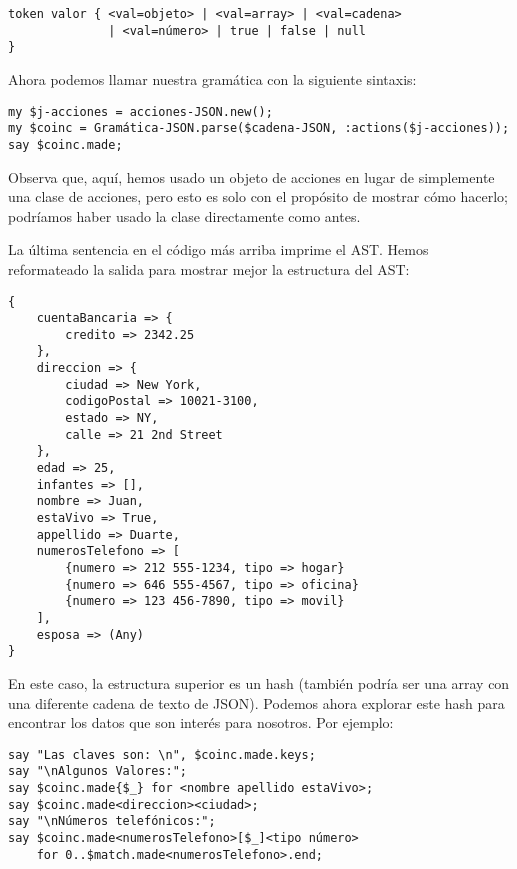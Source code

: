 \begin{verbatim}
token valor { <val=objeto> | <val=array> | <val=cadena> 
              | <val=número> | true | false | null
}
\end{verbatim}

Ahora podemos llamar nuestra gramática con la
siguiente sintaxis:

\begin{verbatim}
my $j-acciones = acciones-JSON.new();
my $coinc = Gramática-JSON.parse($cadena-JSON, :actions($j-acciones));
say $coinc.made;
\end{verbatim}

Observa que, aquí, hemos usado un objeto de acciones en lugar
de simplemente una clase de acciones, pero esto es solo con 
el propósito de mostrar cómo hacerlo; podríamos haber usado
la clase directamente como antes.

La última sentencia en el código más arriba imprime el AST.
Hemos reformateado la salida para mostrar mejor la estructura
del AST:


\begin{verbatim}
{
    cuentaBancaria => {
        credito => 2342.25
    }, 
    direccion => {
        ciudad => New York, 
        codigoPostal => 10021-3100, 
        estado => NY, 
        calle => 21 2nd Street
    }, 
    edad => 25, 
    infantes => [], 
    nombre => Juan, 
    estaVivo => True, 
    appellido => Duarte, 
    numerosTelefono => [
        {numero => 212 555-1234, tipo => hogar} 
        {numero => 646 555-4567, tipo => oficina} 
        {numero => 123 456-7890, tipo => movil}
    ], 
    esposa => (Any)
}
\end{verbatim}

En este caso, la estructura superior es un hash (también podría ser una array
con una diferente cadena de texto de JSON). Podemos ahora explorar
este hash para encontrar los datos que son interés para nosotros.
Por ejemplo:

\begin{verbatim}
say "Las claves son: \n", $coinc.made.keys;
say "\nAlgunos Valores:";
say $coinc.made{$_} for <nombre apellido estaVivo>;
say $coinc.made<direccion><ciudad>;
say "\nNúmeros telefónicos:";
say $coinc.made<numerosTelefono>[$_]<tipo número> 
    for 0..$match.made<numerosTelefono>.end;
\end{verbatim}


